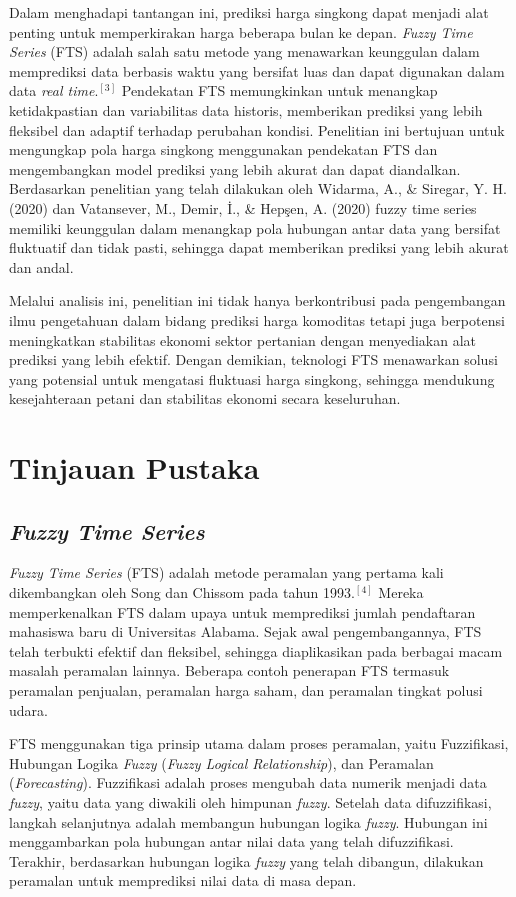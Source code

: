 \documentclass[conference]{IEEEtran}
\begin{document}
Dalam menghadapi tantangan ini, prediksi harga singkong dapat menjadi alat penting untuk memperkirakan harga beberapa bulan ke depan. \textit{Fuzzy Time Series} (FTS) adalah salah satu metode yang menawarkan keunggulan dalam memprediksi data berbasis waktu yang bersifat luas dan dapat digunakan dalam data \textit{real time}.$^{[3]}$ Pendekatan FTS memungkinkan untuk menangkap ketidakpastian dan variabilitas data historis, memberikan prediksi yang lebih fleksibel dan adaptif terhadap perubahan kondisi. Penelitian ini bertujuan untuk mengungkap pola harga singkong menggunakan pendekatan FTS dan mengembangkan model prediksi yang lebih akurat dan dapat diandalkan. Berdasarkan penelitian yang telah dilakukan oleh Widarma, A., \& Siregar, Y. H. (2020) dan Vatansever, M., Demir, İ., \& Hepşen, A. (2020) fuzzy time series memiliki keunggulan dalam menangkap pola hubungan antar data yang bersifat fluktuatif dan tidak pasti, sehingga dapat memberikan prediksi yang lebih akurat dan andal.

Melalui analisis ini, penelitian ini tidak hanya berkontribusi pada pengembangan ilmu pengetahuan dalam bidang prediksi harga komoditas tetapi juga berpotensi meningkatkan stabilitas ekonomi sektor pertanian dengan menyediakan alat prediksi yang lebih efektif. Dengan demikian, teknologi FTS menawarkan solusi yang potensial untuk mengatasi fluktuasi harga singkong, sehingga mendukung kesejahteraan petani dan stabilitas ekonomi secara keseluruhan.


\section{Tinjauan Pustaka}

\subsection{\textit{Fuzzy Time Series}}
\textit{Fuzzy Time Series} (FTS) adalah metode peramalan yang pertama kali dikembangkan oleh Song dan Chissom pada tahun 1993.$^{[4]}$ Mereka memperkenalkan FTS dalam upaya untuk memprediksi jumlah pendaftaran mahasiswa baru di Universitas Alabama. Sejak awal pengembangannya, FTS telah terbukti efektif dan fleksibel, sehingga diaplikasikan pada berbagai macam masalah peramalan lainnya. Beberapa contoh penerapan FTS termasuk peramalan penjualan, peramalan harga saham, dan peramalan tingkat polusi udara.

FTS menggunakan tiga prinsip utama dalam proses peramalan, yaitu Fuzzifikasi, Hubungan Logika \textit{Fuzzy} (\textit{Fuzzy Logical Relationship}), dan Peramalan (\textit{Forecasting}). Fuzzifikasi adalah proses mengubah data numerik menjadi data \textit{fuzzy}, yaitu data yang diwakili oleh himpunan \textit{fuzzy}. Setelah data difuzzifikasi, langkah selanjutnya adalah membangun hubungan logika \textit{fuzzy}. Hubungan ini menggambarkan pola hubungan antar nilai data yang telah difuzzifikasi. Terakhir, berdasarkan hubungan logika \textit{fuzzy} yang telah dibangun, dilakukan peramalan untuk memprediksi nilai data di masa depan.
\end{document}
